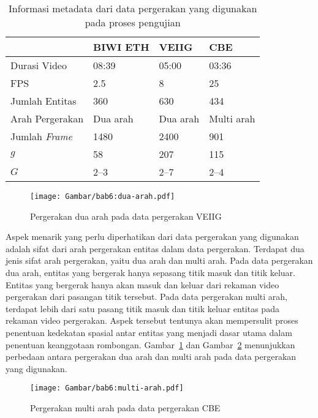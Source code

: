 \begin{table}[h]
    \centering
    \caption[Metadata sumber data pergerakan]{Informasi metadata dari data pergerakan yang digunakan pada proses pengujian}
    \begin{tabular}{p{3cm} p{2.5cm} p{2.5cm} p{3cm}}
        \hline
        & \textbf{BIWI ETH} & \textbf{VEIIG} & \textbf{CBE} \\
        \hline
        Durasi Video & 08:39 & 05:00 & 03:36 \\
        FPS & 2.5 & 8 & 25 \\
        Jumlah Entitas & 360 & 630 & 434 \\
        Arah Pergerakan & Dua arah & Dua arah & Multi arah \\
        Jumlah \textit{Frame} & 1480 & 2400 & 901 \\
        $g$ & 58 & 207 & 115 \\
        $G$ & 2--3 & 2--7 & 2--4 \\
        \hline
    \end{tabular}
    \label{bab6:metadata-pergerakan}
\end{table}

\begin{figure}[b!]
    \centering
    \captionsetup{width=.65\textwidth}
    \texttt{[image: Gambar/bab6:dua-arah.pdf]}
    \caption[Pergerakan dua arah]{Pergerakan dua arah pada data pergerakan VEIIG}
    \label{bab6:dua-arah}
\end{figure}

Aspek menarik yang perlu diperhatikan dari data pergerakan yang digunakan adalah sifat dari arah pergerakan entitas dalam data pergerakan. Terdapat dua jenis sifat arah pergerakan, yaitu dua arah dan multi arah. Pada data pergerakan dua arah, entitas yang bergerak hanya sepasang titik masuk dan titik keluar. Entitas yang bergerak hanya akan masuk dan keluar dari rekaman video pergerakan dari pasangan titik tersebut. Pada data pergerakan multi arah, terdapat lebih dari satu pasang titik masuk dan titik keluar entitas pada rekaman video pergerakan. Aspek tersebut tentunya akan mempersulit proses penentuan kedekatan spasial antar entitas yang menjadi dasar utama dalam penentuan keanggotaan rombongan. Gambar~\ref{bab6:dua-arah} dan Gambar~\ref{bab6:multi-arah} menunjukkan perbedaan antara pergerakan dua arah dan multi arah pada data pergerakan yang digunakan.

\begin{figure}[t!]
    \centering
    \captionsetup{width=.65\textwidth}
    \texttt{[image: Gambar/bab6:multi-arah.pdf]}
    \caption[Pergerakan multi arah]{Pergerakan multi arah pada data pergerakan CBE}
    \label{bab6:multi-arah}
\end{figure}

